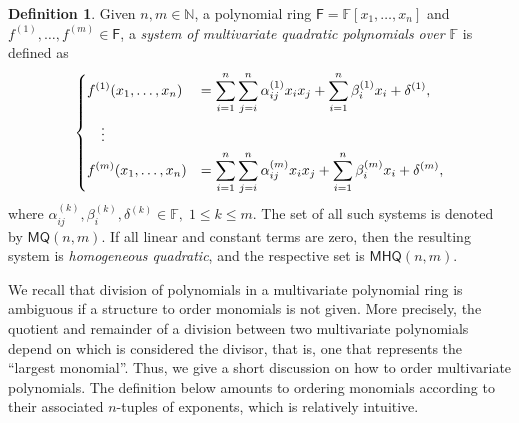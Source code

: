 \documentclass[12pt, a4paper, oneside]{memoir}
\theoremstyle{definition}
\newtheorem{definition}[theorem]{Definition}
\begin{document}
\begin{definition}\label{def:quad-poly-sys}
  Given $n, m \in \mathbb{N}$, a polynomial ring $\mathsf{F} = \mathbb{F}[x_{1}, \dots, x_{n}]$ and $f^{(1)}, \dots, f^{(m)} \in \mathsf{F}$, a \emph{system of multivariate quadratic polynomials over $\mathbb{F}$} is defined as
  \begin{align}
    \begin{split}
      \begin{dcases}
        f^{(1)}(x_{1}, \dots, x_{n}) &= 
          \sum_{i = 1}^{n} \sum_{j = i}^{n} \alpha_{ij}^{(1)} x_{i} x_{j}
            + \sum_{i = 1}^{n} \beta_{i}^{(1)} x_{i} + \delta^{(1)}, \\
        \quad \vdots \\
        f^{(m)}(x_{1}, \dots, x_{n}) &= 
          \sum_{i = 1}^{n} \sum_{j = i}^{n} \alpha_{ij}^{(m)} x_{i} x_{j}
            + \sum_{i = 1}^{n} \beta_{i}^{(m)} x_{i} + \delta^{(m)},
      \end{dcases}
    \end{split}
  \end{align}
  where $\alpha_{ij}^{(k)}, \beta_{i}^{(k)}, \delta^{(k)} \in \mathbb{F},\; 1 \leq k \leq m$. The set of all such systems is denoted by $\mathsf{MQ}(n, m)$. If all linear and constant terms are zero, then the resulting system is \emph{homogeneous quadratic}, and the respective set is $\mathsf{MHQ}(n, m)$.
\end{definition}

We recall that division of polynomials in a multivariate polynomial ring is ambiguous if a structure to order monomials is not given. More precisely, the quotient and remainder of a division between two multivariate polynomials depend on which is considered the divisor, that is, one that represents the ``largest monomial''. Thus, we give a short discussion on how to order multivariate polynomials. The definition below amounts to ordering monomials according to their associated $n$-tuples of exponents, which is relatively intuitive. 
\end{document}
